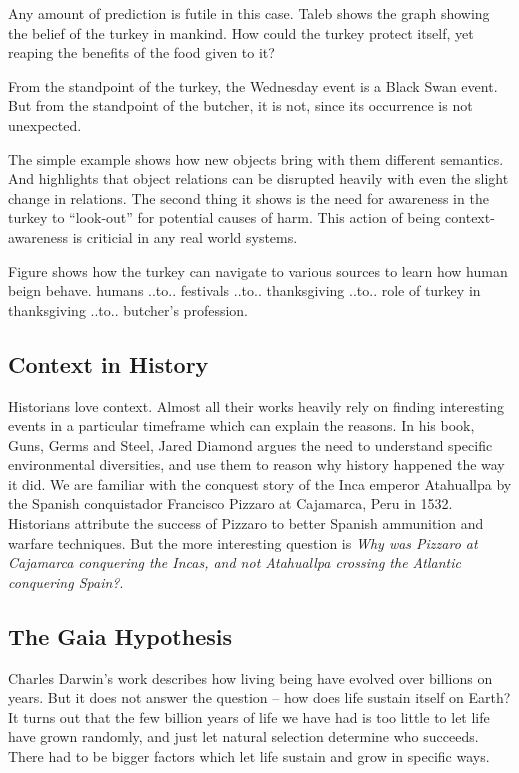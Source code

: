 Any amount of prediction is futile in this case. Taleb shows the graph showing the belief of the turkey in mankind. How could the turkey protect itself, yet reaping the benefits of the food given to it? 

From the standpoint of the turkey, the Wednesday event is a Black Swan event. But from the standpoint of the butcher, it is not, since its occurrence is not unexpected.

The simple example shows how new objects bring with them different semantics. And highlights that object relations can be disrupted heavily with even the slight change in relations. The second thing it shows is the need for awareness in the turkey to ``look-out'' for potential causes of harm. This action of being context-awareness is criticial in any real world systems.

Figure shows how the turkey can navigate to various sources to learn how human beign behave. humans ..to.. festivals ..to.. thanksgiving ..to.. role of turkey in thanksgiving ..to.. butcher's profession.

\subsection{Context in History}
Historians love context. Almost all their works heavily rely on finding interesting events in a particular timeframe which can explain the reasons. In his book, Guns, Germs and Steel, Jared Diamond argues the need to understand specific environmental diversities, and use them to reason why history happened the way it did. We are familiar with the conquest story of the Inca emperor Atahuallpa by the Spanish conquistador Francisco Pizzaro at Cajamarca, Peru in 1532. Historians attribute the success of Pizzaro to better Spanish ammunition and warfare techniques. But the more interesting question is \textit{Why was Pizzaro at Cajamarca conquering the Incas, and not Atahuallpa crossing the Atlantic conquering Spain?}. 

\subsection{The Gaia Hypothesis}
Charles Darwin's work describes how living being have evolved over billions on years. But it does not answer the question -- how does life sustain itself on Earth? It turns out that the few billion years of life we have had is too little to let life have grown randomly, and just let natural selection determine who succeeds. There had to be bigger factors which let life sustain and grow in specific ways.

